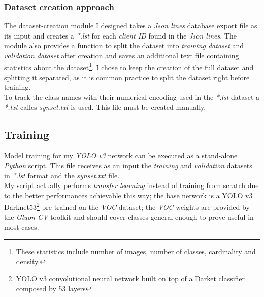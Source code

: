 \subsubsection{Dataset creation approach}
The dataset-creation module I designed takes a \emph{Json lines} database export file as its input and creates a \emph{*.lst} for each \emph{client ID} found in the \emph{Json lines}. The module also provides a function to split the dataset into \emph{training dataset} and \emph{validation dataset} after creation and saves an additional text file containing statistics about the dataset\footnote{These statistics include number of images, number of classes, cardinality and density.}. I chose to keep the creation of the full dataset and splitting it separated, as it is common practice to split the dataset right before training. \\
To track the class names with their numerical encoding used in the \emph{*.lst} dataset a \emph{*.txt} calles \emph{synset.txt} is used. This file must be created manually.


\subsection{Training}
Model training for my \emph{YOLO v3} network can be executed as a stand-alone \emph{Python} script. This file receives as an input the \emph{training} and \emph{validation} datasets in \emph{*.lst} format and the \emph{synset.txt} file. \\
My script actually performs \emph{transfer learning} instead of training from scratch due to the better performances achievable this way; the base network is a YOLO v3 Darknet53\footnote{YOLO v3 convolutional neural network built on top of a Darket classifier composed by 53 layers} pre-trained on the \emph{VOC} dataset; the \emph{VOC} weights are provided by the \emph{Gluon CV} toolkit and should cover classes general enough to prove useful in most cases.

